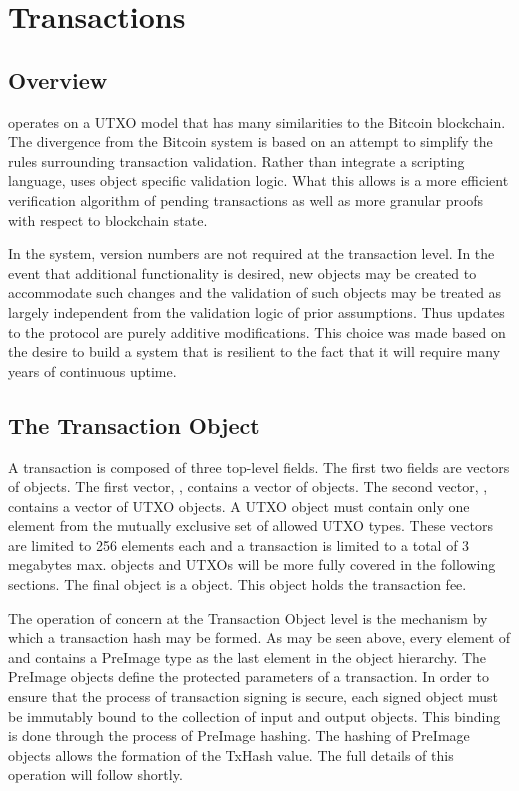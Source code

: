 \section{Transactions}
\subsection{Overview}



\LayerTwoLong{} operates on a UTXO model that has many similarities to the
Bitcoin blockchain.
The divergence from the Bitcoin system is based on an attempt to
simplify the rules surrounding transaction validation.
Rather than integrate a scripting language, \LayerTwoLong{} uses object
specific validation logic.
What this allows is a more efficient verification algorithm of pending
transactions as well as more granular proofs with respect to blockchain
state.

In the \LayerTwoLong{} system, version numbers are not required at the
transaction level.
In the event that additional functionality is desired, new objects may
be created to accommodate such changes and the validation of such
objects may be treated as largely independent from the validation logic
of prior assumptions.
Thus updates to the protocol are purely additive modifications.
This choice was made based on the desire to build a system that is
resilient to the fact that it will require many years of continuous
uptime.


\subsection{The Transaction Object}

A transaction is composed of three top-level fields.
The first two fields are vectors of objects.
The first vector, \Vin{}, contains a vector of \TxIn{} objects.
The second vector, \Vout{}, contains a vector of UTXO objects.
A UTXO object must contain only one element from the mutually exclusive set of
allowed UTXO types.
These vectors are limited to 256 elements each and a transaction is limited to
a total of 3 megabytes max.
\TxIn{} objects and UTXOs will be more fully covered in the following sections.
The final object is a \Fee{} object.
This object holds the transaction fee.

The operation of concern at the Transaction Object level is the mechanism by
which a transaction hash may be formed.
As may be seen above, every element of \Vin{} and \Vout{} contains
a PreImage type as
the last element in the object hierarchy.
The PreImage objects define the protected parameters of a transaction.
In order to ensure that the process of transaction signing is secure, each
signed object must be immutably bound to the collection of input and output
objects.
This binding is done through the process of PreImage hashing.
The hashing of PreImage objects allows the formation of the TxHash value.
The full details of this operation will follow shortly.

